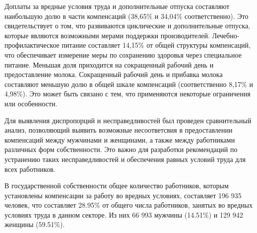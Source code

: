 \begin{multicols}{2}
Доплаты за вредные условия труда и дополнительные отпуска составляют
наибольшую долю в части компенсаций (38,65\% и 34,04\% соответственно).
Это свидетельствует о том, что развиваются циклические и дополнительные
отпуска, которые являются возможными мерами поддержки производителей.
Лечебно-профилактическое питание составляет 14,15\% от общей структуры
компенсаций, что обеспечивает измерение меры по сохранению здоровья
через специальное питание. Меньшая доля приходится на сокращенный
рабочий день и предоставление молока. Сокращенный рабочий день и
прибавка молока составляют меньшую долю в общей шкале компенсаций
(соответственно 8,17\% и 4,98\%). Это может быть связано с тем, что
применяются некоторые ограничения или особенности.

Для выявления диспропорций и несправедливостей был проведен
сравнительный анализ, позволяющий выявить возможные несоответсвия в
предоставлении компенсаций между мужчинами и женщинами, а также между
работниками различных форм собственности. Это важно для разработки
рекомендаций по устранению таких несправедливостей и обеспечения равных
условий труда для всех работников.

В государственной собственности общее количество работников, которым
установлены компенсации за работу во вредных условиях, составляет 196
935 человек, что составляет 28.95\% от общего числа работников, занятых
во вредных условиях труда в данном секторе. Из них 66 993 мужчины
(14.51\%) и 129 942 женщины (59.51\%).
\end{multicols}

